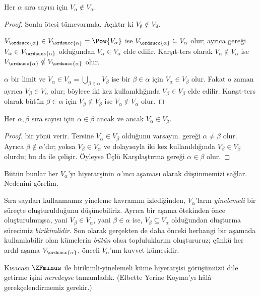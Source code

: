 \begin{lem}
Her $\alpha$ sıra sayısı için $V_\alpha\notin V_\alpha$.
\end{lem}

\begin{proof}
Sonlu ötesi tümevarımla. Açıktır ki
$V_\emptyset\notin V_\emptyset$.

$V_{\ordsucc{\alpha}}\in V_{\ordsucc{\alpha}}=\Pow{V_\alpha}$ ise
$V_{\ordsucc{\alpha}}\subseteq V_\alpha$ olur; ayrıca
 gereği
$V_\alpha\in V_{\ordsucc{\alpha}}$ olduğundan $V_\alpha\in V_\alpha$
elde edilir. Karşıt-ters olarak $V_\alpha\notin V_\alpha$ ise
$V_{\ordsucc{\alpha}}\notin V_{\ordsucc{\alpha}}$ olur.

$\alpha$ bir limit ve
$V_\alpha\in V_\alpha=\bigcup_{\beta\in\alpha}V_\beta$ ise bir
$\beta\in\alpha$ için $V_\alpha\in V_\beta$ olur. Fakat o zaman ayrıca
$V_\beta\in V_\alpha$ olur; böylece
 iki kez kullanıldığında
$V_\beta\in V_\beta$ elde edilir. Karşıt-ters olarak bütün
$\beta\in\alpha$ için $V_\beta\notin V_\beta$ ise
$V_\alpha\notin V_\alpha$ olur.
\end{proof}

\begin{cor}
Her $\alpha,\beta$ sıra sayısı için $\alpha\in\beta$ ancak ve ancak
$V_\alpha\in V_\beta$.
\end{cor}

\begin{proof}
 bir yönü verir. Tersine
$V_\alpha\in V_\beta$ olduğunu varsayın.  gereği
$\alpha\neq\beta$ olur. Ayrıca $\beta\notin\alpha$'dır; yoksa
$V_\beta\in V_\alpha$ ve dolayısıyla
 iki kez kullanıldığında
$V_\beta\in V_\beta$ olurdu; bu da  ile çelişir.
Öyleyse Üçlü Karşılaştırma gereği $\alpha\in\beta$ olur.
\end{proof}
\noindent
Bütün bunlar her $V_\alpha$'yı hiyerarşinin $\alpha$'ıncı aşaması olarak
düşünmemizi sağlar. Nedenini görelim.

Sıra sayıları kullanmamız yineleme kavramını izlediğinden, $V_\alpha$'ların
\emph{yinelemeli} bir süreçte oluşturulduğunu düşünebiliriz. Ayrıca bir
aşama ötekinden önce oluşturulmuşsa, yani $V_\beta\in V_\alpha$, yani
$\beta\in\alpha$ ise, $V_\beta\subseteq V_\alpha$ olduğundan oluşturma
sürecimiz \emph{birikimlidir}. Son olarak gerçekten de daha önceki herhangi
bir aşamada kullanılabilir olan kümelerin \emph{bütün} olası topluluklarını
oluştururuz; çünkü her ardıl aşama $V_{\ordsucc{\alpha}}$, önceli
$V_\alpha$'nın kuvvet kümesidir.

Kısacası $\ZFminus$ ile birikimli-yinelemeli küme hiyerarşisi görüşümüzü
dile getirme işini \emph{neredeyse} tamamladık. (Elbette Yerine Koyma'yı
hâlâ gerekçelendirmemiz gerekir.)

